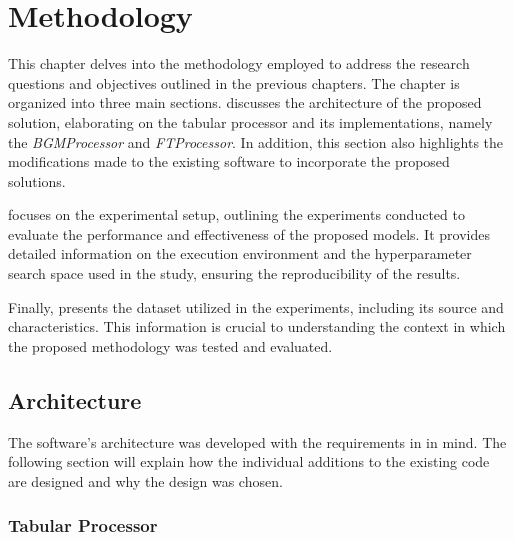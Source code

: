 \chapter{Methodology}
\label{ch:methodology}

This chapter delves into the methodology employed to address the research questions and objectives outlined in the previous chapters.
The chapter is organized into three main sections.
 discusses the architecture of the proposed solution, elaborating on the tabular processor and its implementations, namely the \textit{BGMProcessor} and \textit{FTProcessor}.
In addition, this section also highlights the modifications made to the existing software to incorporate the proposed solutions.

 focuses on the experimental setup, outlining the experiments conducted to evaluate the performance and effectiveness of the proposed models.
It provides detailed information on the execution environment and the hyperparameter search space used in the study, ensuring the reproducibility of the results.

Finally,  presents the dataset utilized in the experiments, including its source and characteristics.
This information is crucial to understanding the context in which the proposed methodology was tested and evaluated.

\section{Architecture}
\label{ch:architecture}

The software's architecture was developed with the requirements in  in mind.
The following section will explain how the individual additions to the existing code are designed and why the design was chosen.


\subsection{Tabular Processor}
\label{ch:architecture-tabularProcessor}

